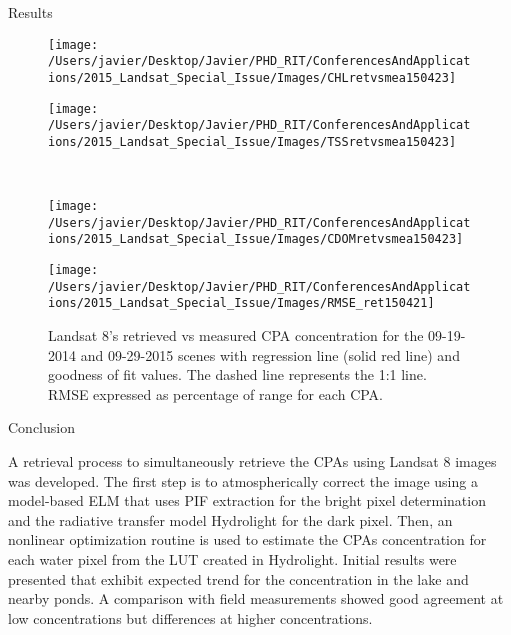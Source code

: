 \documentclass{beamer}
\begin{document}
\begin{frame}{}
\begin{columns}[t]
\begin{column}{.3\linewidth}
\begin{block}{Results}
\begin{figure}[htb]
  \begin{minipage}[c]{0.32\linewidth}
      \texttt{[image: /Users/javier/Desktop/Javier/PHD\_RIT/ConferencesAndApplications/2015\_Landsat\_Special\_Issue/Images/CHLretvsmea150423]}  
  \end{minipage}
  \hspace{1cm}
  \begin{minipage}[d]{0.32\linewidth}
      \texttt{[image: /Users/javier/Desktop/Javier/PHD\_RIT/ConferencesAndApplications/2015\_Landsat\_Special\_Issue/Images/TSSretvsmea150423]}
  \end{minipage}\\
  \begin{minipage}[c]{0.32\linewidth}
      \texttt{[image: /Users/javier/Desktop/Javier/PHD\_RIT/ConferencesAndApplications/2015\_Landsat\_Special\_Issue/Images/CDOMretvsmea150423]}  
  \end{minipage}
  \hspace{1cm}
  \begin{minipage}[c]{0.32\linewidth}
      \texttt{[image: /Users/javier/Desktop/Javier/PHD\_RIT/ConferencesAndApplications/2015\_Landsat\_Special\_Issue/Images/RMSE\_ret150421]}
  \end{minipage}

  \caption{Landsat 8's retrieved vs measured CPA concentration for the 09-19-2014 and 09-29-2015 scenes with regression line (solid red line) and goodness of fit values. The dashed line represents the 1:1 line. RMSE expressed as percentage of range for each CPA. \label{fig:CPAsRetVSMea} } 
\end{figure}        


\end{block}  


\begin{block}{Conclusion}
	
\justifying\small A retrieval process to simultaneously retrieve the CPAs using Landsat 8 images was developed. The first step is to atmospherically correct the image using a model-based ELM that uses PIF extraction for the bright pixel determination and the radiative transfer model Hydrolight for the dark pixel. Then, an nonlinear optimization routine is used to estimate the CPAs concentration for each water pixel from the LUT created in Hydrolight. Initial results were presented that exhibit expected trend for the concentration in the lake and nearby ponds. A comparison with field measurements showed good agreement at low concentrations but differences at higher concentrations.
\vspace{.3cm}
\end{block}



\end{column}
\end{columns}
\end{frame}
\end{document}
